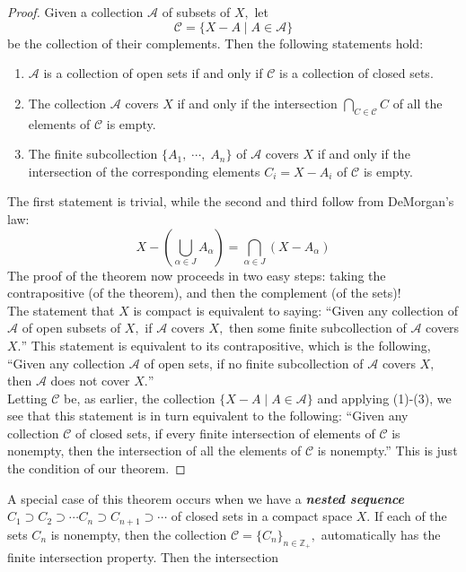 \documentclass{article}
\theoremstyle{definition}
\begin{document}
\begin{proof}
  Given a collection $\mathcal{A}$ of subsets of $X,$ let
  \[\mathcal{C} = \{X - A \;|\; A \in \mathcal{A}\}\]
  be the collection of their complements. Then the following statements hold:
  \begin{enumerate}[nosep, label = (\arabic*)] 
    \item $\mathcal{A}$ is a collection of open sets if and only if $\mathcal{C}$ is a collection of closed sets.
    \item The collection $\mathcal{A}$ covers $X$ if and only if the intersection $\displaystyle\bigcap_{C \in \mathcal{C}}C$ of all the elements of $\mathcal{C}$ is empty.
    \item The finite subcollection $\{A_1,\;\cdots,\;A_n\}$ of $\mathcal{A}$ covers $X$ if and only if the intersection of the corresponding elements $C_i = X - A_i$ of $\mathcal{C}$ is empty.
  \end{enumerate}
  The first statement is trivial, while the second and third follow from DeMorgan's law:
  \[X-\left(\bigcup_{\alpha \in J} A_{\alpha}\right)=\bigcap_{\alpha \in J}\left(X-A_{\alpha}\right)\]
  The proof of the theorem now proceeds in two easy steps: taking the contrapositive (of the theorem), and then the complement (of the sets)!\\
  The statement that $X$ is compact is equivalent to saying: ``Given any collection of $\mathcal{A}$ of open subsets of $X,$ if $\mathcal{A}$ covers $X,$ then some finite subcollection of $\mathcal{A}$ covers $X.$'' This statement is equivalent to its contrapositive, which is the following, ``Given any collection $\mathcal{A}$ of open sets, if no finite subcollection of $\mathcal{A}$ covers $X,$ then $\mathcal{A}$ does not cover $X.$''\\
  Letting $\mathcal{C}$ be, as earlier, the collection $\{X - A\;|\;A\in\mathcal{A}\}$ and applying (1)-(3), we see that this statement is in turn equivalent to the following: ``Given any collection $\mathcal{C}$ of closed sets, if every finite intersection of elements of $\mathcal{C}$ is nonempty, then the intersection of all the elements of $\mathcal{C}$ is nonempty.'' This is just the condition of our theorem.
\end{proof}
A special case of this theorem occurs when we have a \textbf{\emph{nested sequence}} $C_1 \supset C_2 \supset \cdots C_n \supset C_{n+1} \supset \cdots$ of closed sets in a compact space $X.$ If each of the sets $C_n$ is nonempty, then the collection $\mathcal{C} = \{C_n\}_{n\in\mathbb{Z}_+},$ automatically has the finite intersection property. Then the intersection
\end{document}
